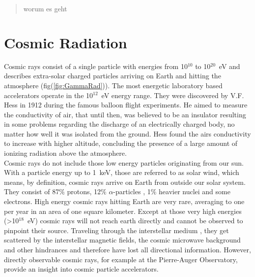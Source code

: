 \documentclass[12pt,article,type=msc,colorback,accentcolor=tud9c]{tudthesis}
\newcommand\blankpage{%
    \null
    \thispagestyle{empty}%
    \addtocounter{page}{-1}%
    \newpage}
\begin{document}
\clearpage
\begin{abstract}
worum es geht
\end{abstract}
\afterpage{\blankpage}

\clearpage
\listoffigures

\clearpage
\tableofcontents


\clearpage
\section{\Large Cosmic Radiation}

%
\begin{figure}[!b] %
\begin{centering}
}
\caption[Cosmic radiation]{Gamma radiation photons (yellow) and scattered cosmic ray protons (blue) from an astrophysical source arriving on Earth. Neutrinos (grey) mostly do not interact. Picture from \cite{ungCTA}}
\label{fig:GammaRad}
\end{centering}
\end{figure}
\noindent
Cosmic rays consist of a single particle with energies from 10$^{10}$ to 10$^{20}$~eV and describes extra-solar charged particles arriving on Earth and hitting the atmosphere (fig(\ref{fig:GammaRad})). The most energetic laboratory based accelerators operate in the 10$^{12}$~eV energy range. They were discovered by V.F. Hess in 1912 during the famous balloon flight experiments. He aimed to measure the conductivity of air, that until then, was believed to be an insulator resulting in some problems regarding the discharge of an electrically charged body, no matter how well it was isolated from the ground. Hess found the airs conductivity to increase with higher altitude, concluding the presence of a large amount of ionizing radiation above the atmosphere. \\
\noindent
Cosmic rays do not include those low energy particles originating from our sun. With a particle energy up to 1~keV, those are referred to as solar wind, which means, by definition, cosmic rays arrive on Earth from outside our solar system. They consist of 87$\%$ protons, 12$\%$ $\alpha$-particles , 1$\%$ heavier nuclei and some electrons. High energy cosmic rays hitting Earth are very rare, averaging to one per year in an area of one square kilometer. Except at those very high energies (>10$^{18}$~eV) cosmic rays will not reach earth directly and cannot be observed to pinpoint their source. Traveling through the interstellar medium , they get scattered by the interstellar magnetic fields, the cosmic microwave background and other hindrances and therefore have lost all directional information. However, directly observable cosmic rays, for example at the Pierre-Auger Observatory, provide an insight into cosmic particle accelerators.\cite{CTADesign}\\
\end{document}
